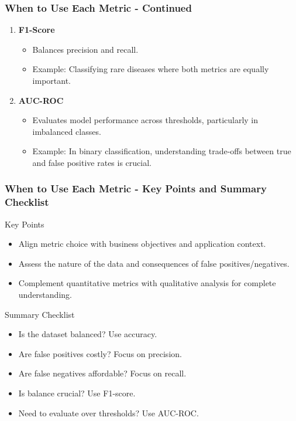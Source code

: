 \documentclass[aspectratio=169]{beamer}
\begin{document}
\begin{frame}[fragile]
    \frametitle{When to Use Each Metric - Continued}
    \begin{enumerate}[resume]
        \item \textbf{F1-Score}
            \begin{itemize}
                \item Balances precision and recall.
                \item Example: Classifying rare diseases where both metrics are equally important.
            \end{itemize}

        \item \textbf{AUC-ROC}
            \begin{itemize}
                \item Evaluates model performance across thresholds, particularly in imbalanced classes.
                \item Example: In binary classification, understanding trade-offs between true and false positive rates is crucial.
            \end{itemize}
    \end{enumerate}
\end{frame}

\begin{frame}[fragile]
    \frametitle{When to Use Each Metric - Key Points and Summary Checklist}
    \begin{block}{Key Points}
        \begin{itemize}
            \item Align metric choice with business objectives and application context.
            \item Assess the nature of the data and consequences of false positives/negatives.
            \item Complement quantitative metrics with qualitative analysis for complete understanding.
        \end{itemize}
    \end{block}

    \begin{block}{Summary Checklist}
        \begin{itemize}
            \item Is the dataset balanced? Use accuracy.
            \item Are false positives costly? Focus on precision.
            \item Are false negatives affordable? Focus on recall.
            \item Is balance crucial? Use F1-score.
            \item Need to evaluate over thresholds? Use AUC-ROC.
        \end{itemize}
    \end{block}
\end{frame}
\end{document}
